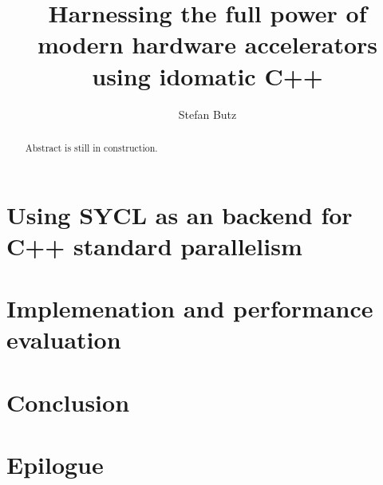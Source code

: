 \documentclass[manuscript,nonacm]{acmart}
\title{Harnessing the full power of modern hardware accelerators using idomatic C++}
\author{Stefan Butz}
\affiliation{%
    \institution{University of Hagen}
    \city{Hagen}
    \country{Germany}
}
\begin{document}
\begin{abstract}
Abstract is still in construction.
\end{abstract}


\maketitle







\section{Using SYCL as an backend for C++ standard parallelism}

\section{Implemenation and performance evaluation}

\section{Conclusion}


\section{Epilogue}



 
\end{document}
